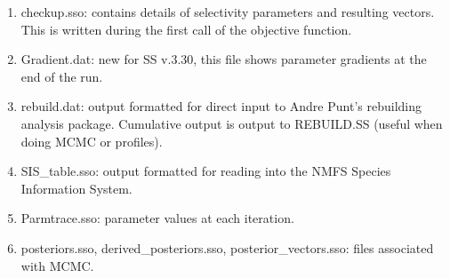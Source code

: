 \begin{enumerate}
		\item checkup.sso:  contains details of selectivity parameters and resulting vectors.  This is written during the first call of the objective function.
		\item Gradient.dat: new for SS v.3.30, this file shows parameter gradients at the end of the run.
		\item rebuild.dat:  output formatted for direct input to Andre Punt's rebuilding analysis package.  Cumulative output is output to REBUILD.SS (useful when doing MCMC or profiles).
		\item SIS\_table.sso:  output formatted for reading into the NMFS Species Information System.
		\item Parmtrace.sso: parameter values at each iteration.
		\item posteriors.sso, derived\_posteriors.sso, posterior\_vectors.sso: files associated with MCMC.
	\end{enumerate}

	
